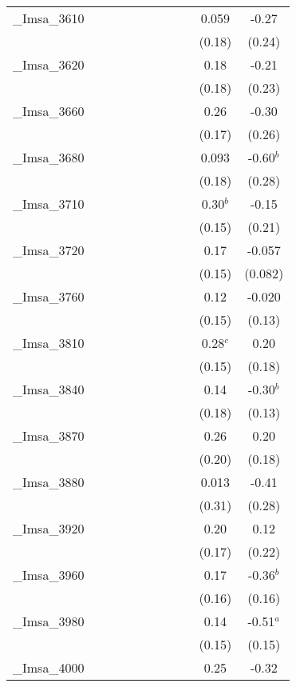 \documentclass[]{article}
\begin{document}
\begin{tabular}{lcccccccccc}
\_Imsa\_3610 &  &  &  &  &  &  &  &  & 0.059 & -0.27 \\
 &  &  &  &  &  &  &  &  & (0.18) & (0.24) \\
\_Imsa\_3620 &  &  &  &  &  &  &  &  & 0.18 & -0.21 \\
 &  &  &  &  &  &  &  &  & (0.18) & (0.23) \\
\_Imsa\_3660 &  &  &  &  &  &  &  &  & 0.26 & -0.30 \\
 &  &  &  &  &  &  &  &  & (0.17) & (0.26) \\
\_Imsa\_3680 &  &  &  &  &  &  &  &  & 0.093 & -0.60$^b$ \\
 &  &  &  &  &  &  &  &  & (0.18) & (0.28) \\
\_Imsa\_3710 &  &  &  &  &  &  &  &  & 0.30$^b$ & -0.15 \\
 &  &  &  &  &  &  &  &  & (0.15) & (0.21) \\
\_Imsa\_3720 &  &  &  &  &  &  &  &  & 0.17 & -0.057 \\
 &  &  &  &  &  &  &  &  & (0.15) & (0.082) \\
\_Imsa\_3760 &  &  &  &  &  &  &  &  & 0.12 & -0.020 \\
 &  &  &  &  &  &  &  &  & (0.15) & (0.13) \\
\_Imsa\_3810 &  &  &  &  &  &  &  &  & 0.28$^c$ & 0.20 \\
 &  &  &  &  &  &  &  &  & (0.15) & (0.18) \\
\_Imsa\_3840 &  &  &  &  &  &  &  &  & 0.14 & -0.30$^b$ \\
 &  &  &  &  &  &  &  &  & (0.18) & (0.13) \\
\_Imsa\_3870 &  &  &  &  &  &  &  &  & 0.26 & 0.20 \\
 &  &  &  &  &  &  &  &  & (0.20) & (0.18) \\
\_Imsa\_3880 &  &  &  &  &  &  &  &  & 0.013 & -0.41 \\
 &  &  &  &  &  &  &  &  & (0.31) & (0.28) \\
\_Imsa\_3920 &  &  &  &  &  &  &  &  & 0.20 & 0.12 \\
 &  &  &  &  &  &  &  &  & (0.17) & (0.22) \\
\_Imsa\_3960 &  &  &  &  &  &  &  &  & 0.17 & -0.36$^b$ \\
 &  &  &  &  &  &  &  &  & (0.16) & (0.16) \\
\_Imsa\_3980 &  &  &  &  &  &  &  &  & 0.14 & -0.51$^a$ \\
 &  &  &  &  &  &  &  &  & (0.15) & (0.15) \\
\_Imsa\_4000 &  &  &  &  &  &  &  &  & 0.25 & -0.32 \\

\end{tabular}
\end{document}
